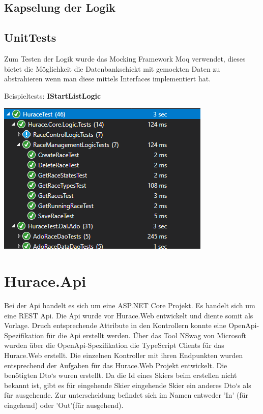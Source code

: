 \documentclass[a4paper, 12pt]{article}
\begin{document}
	\subsection{Kapselung der Logik}
	
	\subsection{UnitTests}
	Zum Testen der Logik wurde das Mocking Framework Moq verwendet, dieses bietet die Möglichkeit die Datenbankschickt mit gemockten Daten zu abstrahieren wenn man diese mittels Interfaces implementiert hat.
	
	Beispieltests:
	\textbf{IStartListLogic}
	
	
	
	\includegraphics[width=.7\textwidth]{img/UnitTests2.png}

	\newpage
	
	\section{Hurace.Api}
	Bei der Api handelt es sich um eine ASP.NET Core Projekt. Es handelt sich um eine REST Api. Die Api wurde vor Hurace.Web entwickelt und diente somit als Vorlage. Druch entsprechende Attribute in den Kontrollern konnte eine OpenApi-Spezifikation für die Api erstellt werden. Über das Tool NSwag von Microsoft wurden über die OpenApi-Spezifikation die TypeScript Clients für das Hurace.Web erstellt. Die einzelnen Kontroller mit ihren Endpunkten wurden entsprechend der Aufgaben für das Hurace.Web Projekt entwickelt. Die benötigten Dto`s wuren erstellt. Da die Id eines Skiers beim erstellen nicht bekannt ist, gibt es für eingehende Skier eingehende Skier ein anderes Dto`s als für ausgehende. Zur unterscheidung befindet sich im Namen entweder 'In' (für eingehend) oder 'Out'(für ausgehend). 
\end{document}
